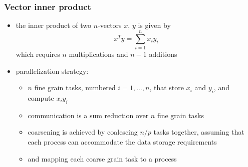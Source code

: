 \begin{frame}[fragile]
%
  \frametitle{Vector inner product}
%
  \begin{itemize}
%
  \item the inner product of two $n$-vectors $x$, $y$ is given by
    \begin{equation}
    x^{T}y = \sum_{i=1}^{n} x_{i}y_{i}
    \end{equation}
    which requires $n$ multiplications and $n-1$ additions
%
  \item parallelization strategy:
    \begin{itemize}
    \item $n$ fine grain tasks, numbered $i = 1, \ldots, n$, that store $x_{i}$ and $y_{i}$,
      and compute $x_{i} y_{i}$
    \item communication is a sum reduction over $n$ fine grain tasks
    \item coarsening is achieved by coalescing $n/p$ tasks together, assuming that each process
      can accommodate the data storage requirements
    \item and mapping each coarse grain task to a process
    \end{itemize}
%
  \end{itemize}
%
\end{frame}

